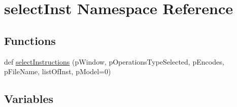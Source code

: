 \hypertarget{namespaceselectInst}{}\section{select\+Inst Namespace Reference}
\label{namespaceselectInst}
\subsection*{Functions}
\begin{DoxyCompactItemize}
\item 
def \hyperlink{namespaceselectInst_aa3e5ba64bce35a9ce05331fcca1e0072}{select\+Instructions} (p\+Window, p\+Operations\+Type\+Selected, p\+Encodes, p\+File\+Name, list\+Of\+Inst, p\+Model=0)
\end{DoxyCompactItemize}
\subsection*{Variables}
